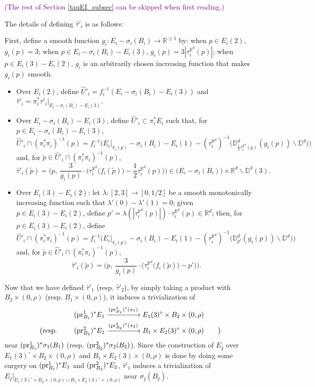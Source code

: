 \documentclass[11pt]{article}
\theoremstyle{definition}
\theoremstyle{remark}
\def\R{\mathbb{R}}
\def\D{\mathbb{D}}
\def\rI{{\mathring{I}}}
\def\cmt#1{\textcolor{purple}{(#1)}}
\def\tn#1{\textnormal{#1}}
\def\pr{{\textnormal{pr}}}
\begin{document}


\cmt{The rest of Section \ref{tauEI_subsec} can be skipped when first reading.}

The details of defining $\hat\tau'_i$ is as follows:

First, define a smooth function
$g_i:E_i-\sigma_i(B_i)\to \R^{\ge1}$ by: 
when $p\in E_i(2)$, 
$g_i(p)=
3$; when $p\in E_i-\sigma_i(B_i)-E_i(3)$, 
$g_i(p)= 3|\tau^{\R^d}_i(p)|$; 
when $p\in E_i(3)-E_i(2)$, $g_i$ is an arbitrarily chosen increasing function that makes $g_i(p)$ smooth. 

\begin{itemize}
\item Over $E_i(2)$, define $\hat{U}'_i=f_i^{-1}(E_i-\sigma_i(B_i)-E_i(3))$ and $\hat\tau'_i=\pi_i^*\tau'_i|_{E_i-\sigma_i(B_i)-E_i(3)}$. 
\item Over $E_i-\sigma_i(B_i)-E_i(3)$, define $\hat{U}'_i\subset \pi^*_iE_i$ such that, for $p\in E_i-\sigma_i(B_i)-E_i(3)$, 
$$\hat{U}'_i\cap (\pi_i^*\pi_i)^{-1}(p)=f_i^{-1}\Big(E_i|_{\pi_i(p)}-\sigma_i(B_i)-E_i(1)-(\tau^{\R^d}_i)^{-1}\big(\D^d_{\frac{1}{2}\tau^{\R^d}_i(p)}(g_i(p))\backslash\D^d\big)\Big)$$
and, for $\tilde{p}\in \hat{U}'_i\cap(\pi_i^*\pi_i)^{-1}(p)$, 
$$\hat\tau'_i(\tilde{p})=\Big(p,\ 
\frac{3}{g_i(p)}\cdot\big(\tau^{\R^d}_i\big(f_i(\tilde p)\big)-\frac{1}{2}\tau^{\R^d}_i(p)\big)\Big)\in  \big(E_i-\sigma_i(B_i)\big)\times \R^d\backslash\D^d(3).$$
\item Over $E_i(3)-E_i(2)$: let $\lambda:[2,3]\to[0,1/2]$ be a smooth monotonically increasing function such that $\lambda'(0)-\lambda'(1)=0$; given $p\in E_i(3)-E_i(2)$, define $p'=\lambda(|\tau^{\R^d}_i(p)|)\cdot\tau^{\R^d}_i(p)\in\R^d$; 
then, for $p\in E_i(3)-E_i(2)$, define
$$\hat{U}'_i\cap (\pi_i^*\pi_i)^{-1}(p)=f_i^{-1}\Big(E_i|_{\pi_i(p)}-\sigma_i(B_i)-E_i(1)-(\tau^{\R^d}_i)^{-1}\big(\D^d_{p'}(g_i(p))\backslash\D^d\big)\Big)$$
and, for $\tilde{p}\in \hat{U}'_i\cap(\pi_i^*\pi_i)^{-1}(p)$, 
$$\hat\tau'_i(\tilde{p})=\Big(p,\ \frac{3}{g_i(p)}\cdot\big(\tau^{\R^d}_i\big(f_i(\tilde p)\big)-p'\big)\Big).$$
\end{itemize}

Now that we have defined $\hat\tau'_1$ (resp. $\hat\tau'_2$), by simply taking a product with $B_2\times(0,\rho)$ (resp. $B_1\times(0,\rho)$), it induces a trivialization of 
\begin{align*}
(\pr^1_{B_1})^*E_1&\xrightarrow{(\pr^1_{B_1})^*(\pi_1)}E_1(3)^\circ\times B_2\times(0,\rho)\\
\big(\tn{resp. }\qquad (\pr^2_{B_2})^*E_2&\xrightarrow{(\pr^2_{B_2})^*(\pi_2)}B_1\times E_2(3)^\circ\times(0,\rho)\qquad\big)
\end{align*}
near $(\pr^1_{B_1})^*\sigma_1(B_1)$ (resp. $(\pr^2_{B_2})^*\sigma_2(B_2)$).
Since the construction of $E_\rI$ over $E_1(3)^\circ\times B_2\times(0,\rho)$ and $B_1\times E_2(3)\times(0,\rho)$ is done by doing some surgery on $(\pr^1_{B_1})^*E_1$ and $(\pr^2_{B_2})^*E_2$, $\hat\tau'_1$ induces a trivialization of $E_\rI|_{E_1(3)^\circ\times B_2\times(0,\rho)\cup B_1\times E_2(3)^\circ\times(0,\rho)}$ near $\sigma_\rI(B_\rI)$. 
\end{document}
